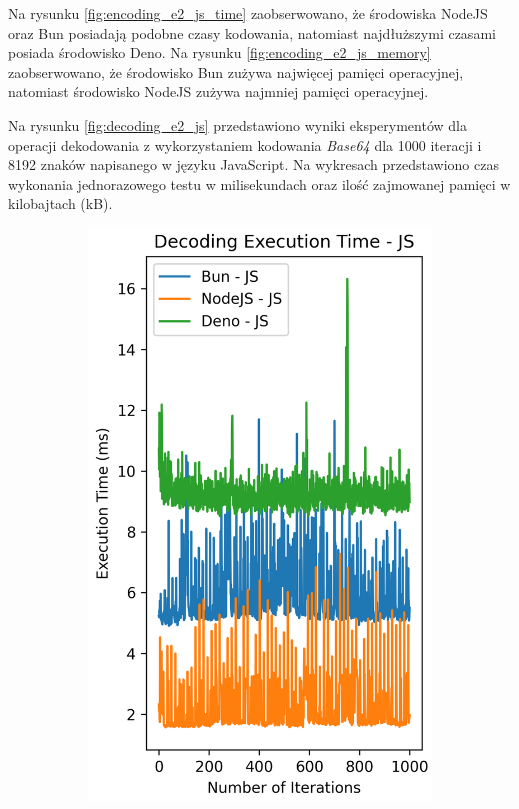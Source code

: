 Na rysunku \ref{fig:encoding_e2_js_time} zaobserwowano, że środowiska NodeJS oraz Bun posiadają podobne czasy kodowania, natomiast najdłuższymi czasami posiada środowisko Deno. Na rysunku \ref{fig:encoding_e2_js_memory} zaobserwowano, że środowisko Bun zużywa najwięcej pamięci operacyjnej, natomiast środowisko NodeJS zużywa najmniej pamięci operacyjnej.

Na rysunku \ref{fig:decoding_e2_js} przedstawiono wyniki eksperymentów dla operacji dekodowania z wykorzystaniem kodowania \textit{Base64} dla 1000 iteracji i 8192 znaków napisanego w języku JavaScript. Na wykresach przedstawiono czas wykonania jednorazowego testu w milisekundach oraz ilość zajmowanej pamięci w kilobajtach (kB).

\begin{figure}[H]
  \centering
  \begin{subfigure}[b]{0.44\textwidth}
    \centering
    \includegraphics[width=\textwidth]{Figures/coding/base64_1000_decoding_js_time.png}

\end{subfigure}
\end{figure}
